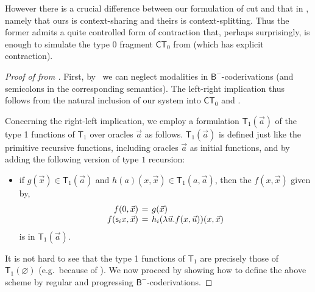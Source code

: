 \documentclass[manuscript,screen]{acmart}
\renewcommand{\emptyset}{\varnothing}
\newcommand{\anupam}[1]{\todo{A: #1}}
\theoremstyle{definition}
\theoremstyle{remark}
\newcommand{\n}{N}
\newcommand{\sq}{\Box}
\newcommand{\sqn}{{\sq\n}}
\newcommand{\sn}{\sqn}
\renewcommand{\succ}[1]{\mathsf{s}_{#1}}
\newcommand{\bc}{\mathsf{B}}
\newcommand{\bcnorec}{\bc^{-}}
\newcommand{\cntr}{\mathsf{c}}
\newcommand{\tgodel}{\mathsf{T}}
\newcommand{\ntgodel}[1]{\tgodel_{#1}}
\newcommand{\ct}{\mathsf{CT}}
\begin{document}
However there is a crucial difference between our formulation of cut and that in \cite{Kuperberg-Pous21}, namely that ours is context-sharing and theirs is context-splitting.
Thus the former admits a quite controlled form of contraction that, perhaps surprisingly, is enough to simulate the type 0 fragment $\ct_0$ from \cite{Das2021} (which has explicit contraction).


\begin{proof}[Proof of  from ]
First, by~ we can neglect modalities in $\bcnorec$-coderivations (and semicolons in the corresponding semantics). The left-right implication thus follows from the natural inclusion of our system into $\ct_0$ and \cite[Corollary 80]{Das2021}. 

Concerning the right-left implication, 
we employ a formulation $\ntgodel 1 (\vec a)$ of the type 1 functions of $\ntgodel 1$ over oracles $\vec a$ as follows. 
$\ntgodel 1(\vec a)$ is defined just like the primitive recursive functions, including oracles $\vec a$ as initial functions, and by adding the following version of type $1$ recursion:
  \begin{itemize}
      \item if $g(\vec x) \in \ntgodel 1 (\vec a)$ and $h(a)(x,\vec x) \in \ntgodel 1 (a, \vec a)$, then the $f(x, \vec x)$ given by,
    \[
    \arraycolsep=2pt
    \begin{array}{rcl}
        f(0, \vec x) & = & g(\vec x) \\
        f( \succ i x , \vec x) & = & h_i (\lambda \vec u . f(x, \vec u)) (x, \vec x)
    \end{array}
    \]
    is in $\ntgodel 1 (\vec a)$.
  \end{itemize}
  It is not hard to see that the type 1 functions of $\ntgodel 1$ are precisely those of $\ntgodel 1 (\emptyset)$ (e.g.\ because of \cite[Appendix A]{Das2021-preprint}).  
  We now proceed by showing how to define the above scheme by regular and progressing $\bcnorec$-coderivations.


\end{proof}
\end{document}
